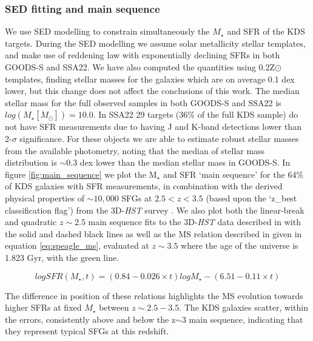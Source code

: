 \documentclass[fleqn,usenatbib]{mn2e}
\begin{document}
\subsubsection{SED fitting and main sequence}\label{subsubsec:sed_fitting}
We use SED modelling to constrain simultaneously the $M_{\star}$ and SFR of the KDS targets.
During the SED modelling we assume solar metallicity stellar templates, and make use of \cite{Calzetti2000} reddening law with exponentially declining SFRs in both GOODS-S and SSA22.
We have also computed the quantities using 0.2Z$\odot$ templates, finding stellar masses for the galaxies which are on average 0.1 dex lower, but this change does not affect the conclusions of this work.
The median stellar mass for the full observed samples in both GOODS-S and SSA22 is $log(M_{\star}[M_{\odot}]) = 10.0$.
In SSA22 29 targets (36\% of the full KDS sample) do not have SFR measurements due to having J and K-band detections lower than 2-$\sigma$ significance.
For these objects we are able to estimate robust stellar masses from the available photometry, noting that the median of stellar mass distribution is $\sim 0.3$ dex lower than the median stellar mass in GOODS-S.
In figure \ref{fig:main_sequence} we plot the M$_{\star}$ and SFR `main sequence' for the 64\% of KDS galaxies with SFR measurements, in combination with the derived physical properties of $\sim 10,000$ SFGs at $2.5 < z < 3.5$  (based upon the `z\_best classification flag') from the 3D-{\em HST} survey \citep{Brammer2012,Momcheva2016}.
We also plot both the linear-break and quadratic $z\sim 2.5$ main sequence fits to the 3D-{\em HST} data described in \cite{Whitaker2014} with the solid and dashed black lines as well as the MS relation described in \cite{Speagle2014} given in equation \ref{eq:speagle_ms}, evaluated at $z\sim3.5$ where the age of the universe is 1.823 Gyr, with the green line.

\begin{equation}\label{eq:speagle_ms}
logSFR(M_{\star}, t) = (0.84 - 0.026 \times t)logM_{\star} - (6.51 - 0.11 \times t)
\end{equation}

The difference in position of these relations highlights the MS evolution towards higher SFRs at fixed $M_{\star}$ between $z\sim2.5-3.5$.
The KDS galaxies scatter, within the errors, consistently above and below the z$\sim3$ main sequence, indicating that they represent typical SFGs at this redshift.
\end{document}
